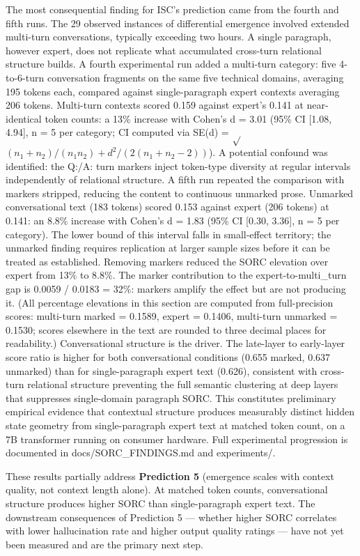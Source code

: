 \documentclass[12pt]{article}
\begin{document}
The most consequential finding for ISC's prediction came from the fourth
and fifth runs. The 29 observed instances of differential emergence
involved extended multi-turn conversations, typically exceeding two
hours. A single paragraph, however expert, does not replicate what
accumulated cross-turn relational structure builds. A fourth
experimental run added a multi-turn category: five 4-to-6-turn
conversation fragments on the same five technical domains, averaging 195
tokens each, compared against single-paragraph expert contexts averaging
206 tokens. Multi-turn contexts scored 0.159 against expert's 0.141 at
near-identical token counts: a 13\% increase with Cohen's d = 3.01 (95\%
CI {[}1.08, 4.94{]}, n = 5 per category; CI computed via SE(d) =
$\sqrt{}$$(n_1+n_2)/(n_1 n_2) + d^2/(2(n_1+n_2-2))$). A potential confound was
identified: the Q:/A: turn markers inject token-type diversity at
regular intervals independently of relational structure. A fifth run
repeated the comparison with markers stripped, reducing the content to
continuous unmarked prose. Unmarked conversational text (183 tokens)
scored 0.153 against expert (206 tokens) at 0.141: an 8.8\% increase
with Cohen's d = 1.83 (95\% CI {[}0.30, 3.36{]}, n = 5 per category).
The lower bound of this interval falls in small-effect territory; the
unmarked finding requires replication at larger sample sizes before it
can be treated as established. Removing markers reduced the SORC
elevation over expert from 13\% to 8.8\%. The marker contribution to the
expert-to-multi\_turn gap is 0.0059 / 0.0183 = 32\%: markers amplify the
effect but are not producing it. (All percentage elevations in this
section are computed from full-precision scores: multi-turn marked =
0.1589, expert = 0.1406, multi-turn unmarked = 0.1530; scores elsewhere
in the text are rounded to three decimal places for readability.)
Conversational structure is the driver. The late-layer to early-layer
score ratio is higher for both conversational conditions (0.655 marked,
0.637 unmarked) than for single-paragraph expert text (0.626),
consistent with cross-turn relational structure preventing the full
semantic clustering at deep layers that suppresses single-domain
paragraph SORC. This constitutes preliminary empirical evidence that
contextual structure produces measurably distinct hidden state geometry
from single-paragraph expert text at matched token count, on a 7B
transformer running on consumer hardware. Full experimental progression
is documented in docs/SORC\_FINDINGS.md and experiments/.

These results partially address \textbf{Prediction 5} (emergence scales
with context quality, not context length alone). At matched token
counts, conversational structure produces higher SORC than
single-paragraph expert text. The downstream consequences of Prediction
5 --- whether higher SORC correlates with lower hallucination rate and
higher output quality ratings --- have not yet been measured and are the
primary next step.
\end{document}
